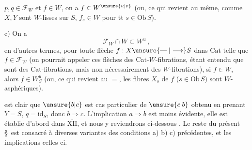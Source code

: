 $p,q\in\mathcal F_W$ et $f\in W$, on a $f\in W^{\unsure{u|v}}$ (ou,
ce qui revient au même,  comme $X,Y$ sont
$W$-lisses sur $S$, $f_s\in W$ pour tt $s\in\mathrm{Ob}\, S$).

c)  On a
\[
\mathcal F_W\cap W\subset W^u\,,
\]
en d'autres termes, pour toute flèche
$f:X\unsure{\mathrel{\text{---}}|\longrightarrow} S$ dans $\mathrm{Cat}$ telle que $f\in\mathcal F_W$
(on pourrait appeler ces flèches des Cat-$W$-fibrations, étant entendu que  sont  des
Cat-fibrations, mais non nécessairement
des $W$-fibrations), si $f\in W$, alors
$f\in W_S^u$ (ou, ce qui revient au $=$, les fibres
$X_s$ de $f$ ($s\in\mathrm{Ob}\,S$) sont $W$-asphériques).


 est clair que $\unsure{b|c}$ est  cas particulier
de $\unsure{c|b}$ obtenu en prenant $Y=S$, $q=\mathrm{id}_S$,
donc $b\Longrightarrow c$. L'implication $a\Longrightarrow b$ est
moins évidente, elle est établie d'abord dans
$\overline{\underline{\mathrm{XII}}}$, et nous y reviendrons ci-dessous .
Le reste du présent \S\ est consacré à  
diverses variantes des conditions a) b) c)
précédentes, et les implications  celles-ci.

